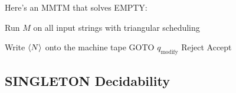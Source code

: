 \documentclass[12pt]{article}
\begin{document}
Here's an MMTM that solves EMPTY:
\begin{algorithmic}[1]
            \State Run $M$ on all input strings with triangular scheduling
                \State \Return
            \Else
            \EndIf
        \EndProcedure

        \item[]
        \State Write $\Braket{N}$ onto the machine tape
        \State GOTO $q_{\text{modify}}$
            \State Reject
            \State Accept
        \EndIf
    \EndProcedure
\end{algorithmic}

\pagebreak

\subsection{SINGLETON Decidability}\label{sec:singleton}
\end{document}
